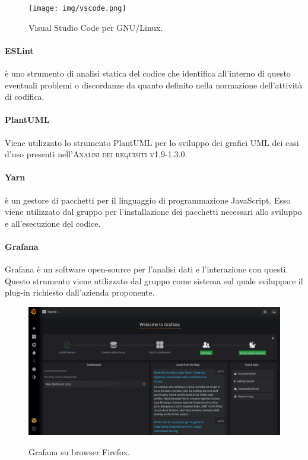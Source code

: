 \documentclass[../norme-di-progetto.tex]{subfiles}
\begin{document}
\begin{figure}[H]
  \centering
  \texttt{[image: img/vscode.png]}
  \label{fig:github}
  \caption{Visual Studio Code per GNU/Linux.}
\end{figure}

\paragraph{ESLint}
 è uno strumento di analisi statica del codice che identifica all'interno di questo eventuali problemi o discordanze da quanto definito nella normazione dell'attività di codifica.

\paragraph{PlantUML}
Viene utilizzato lo strumento PlantUML per lo sviluppo dei grafici UML dei casi d'uso presenti nell'\textsc{Analisi dei requisiti v1.9-1.3.0}.

\paragraph{Yarn}
 è un gestore di pacchetti per il linguaggio di programmazione JavaScript. Esso viene utilizzato dal gruppo per l'installazione dei pacchetti necessari allo sviluppo e all'esecuzione del codice.

\paragraph{Grafana}
Grafana è un software open-source per l'analisi dati e l'interazione con questi. Questo strumento viene utilizzato dal gruppo come sistema sul quale sviluppare il plug-in richiesto dall'azienda proponente.

\begin{figure}[H]
  \centering
  \includegraphics[width=15cm]{img/grafana.png}
  \label{fig:github}
  \caption{Grafana su browser Firefox.}
\end{figure}
\end{document}
